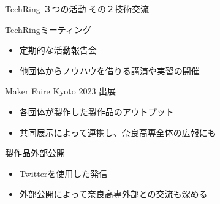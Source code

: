 \documentclass[dvipdfmx]{beamer}
\begin{document}
\begin{frame}{TechRing ３つの活動 その２}{技術交流}


  \vspace{-5mm}

  \begin{alertblock}{TechRingミーティング}
    \begin{itemize}
      \item 定期的な活動報告会
      \item 他団体からノウハウを借りる講演や実習の開催
    \end{itemize}
  \end{alertblock}

  \begin{alertblock}{Maker Faire Kyoto 2023 出展}
    \begin{itemize}
      \item 各団体が製作した製作品のアウトプット
      \item 共同展示によって連携し、奈良高専全体の広報にも
    \end{itemize}
  \end{alertblock}

  \begin{block}{製作品外部公開}
    \begin{itemize}
      \item Twitterを使用した発信
      \item 外部公開によって奈良高専外部との交流も深める
    \end{itemize}
  \end{block}
\end{frame}
\end{document}
